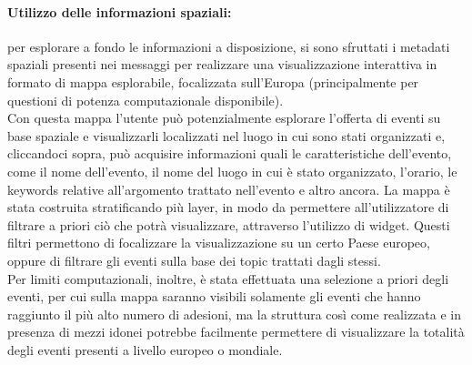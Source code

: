 \documentclass[fleqn,10pt]{SelfArx} %
\begin{document}
{\paragraph{Utilizzo delle informazioni spaziali:}
per esplorare a fondo le informazioni a disposizione, si sono sfruttati i metadati spaziali presenti nei messaggi per realizzare una visualizzazione interattiva in formato di mappa esplorabile, focalizzata sull'Europa (principalmente per questioni di
potenza computazionale disponibile). \\
Con questa mappa l'utente può potenzialmente esplorare l'offerta di eventi su base spaziale e visualizzarli localizzati nel luogo in cui sono stati organizzati e, cliccandoci sopra, può acquisire informazioni quali le caratteristiche dell'evento, come il nome dell'evento, il nome del luogo in cui è stato organizzato, l'orario, le keywords relative all'argomento trattato nell'evento e altro ancora. 
La mappa è stata costruita stratificando più layer, in modo da permettere all'utilizzatore di filtrare a priori ciò che potrà visualizzare, attraverso l'utilizzo di widget. 
Questi filtri permettono di focalizzare la visualizzazione su un certo Paese europeo, oppure di filtrare gli eventi sulla base dei topic trattati dagli stessi. \\
Per limiti computazionali, inoltre, è stata effettuata una selezione a priori degli eventi, per cui sulla mappa saranno visibili solamente gli eventi che hanno raggiunto il più alto numero di adesioni, ma la struttura così come realizzata e in presenza di mezzi idonei potrebbe facilmente permettere di visualizzare la totalità degli eventi presenti a livello europeo o mondiale.
}
\end{document}
